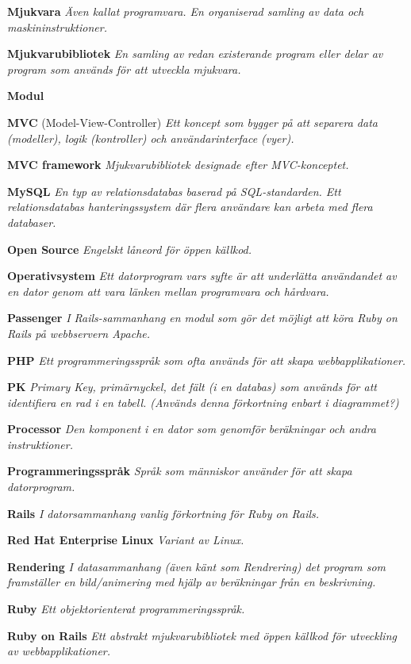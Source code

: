 \documentclass[a4paper, twoside, 11pt, titlepage]{article}
\begin{document}
	\textbf{Mjukvara} \emph{Även kallat programvara. En organiserad samling av data och maskininstruktioner.}

	\textbf{Mjukvarubibliotek} \emph{En samling av redan existerande program eller delar av program som används för att utveckla mjukvara.}

	\textbf{Modul}

	\textbf{MVC} (Model-View-Controller) \emph{Ett koncept som bygger på att separera data (modeller), logik (kontroller) och användarinterface (vyer).}

	\textbf{MVC framework} \emph{Mjukvarubibliotek designade efter MVC-konceptet.}

	\textbf{MySQL} \emph{En typ av relationsdatabas baserad på SQL-standarden. Ett relationsdatabas hanteringssystem där flera användare kan arbeta med flera databaser.}

	\textbf{Open Source} \emph{Engelskt låneord för öppen källkod.}

	\textbf{Operativsystem} \emph{Ett datorprogram vars syfte är att underlätta användandet av en dator genom att vara länken mellan programvara och hårdvara.}

	\textbf{Passenger} \emph{I Rails-sammanhang en modul som gör det möjligt att köra Ruby on Rails på webbservern Apache.}

	\textbf{PHP} \emph{Ett programmeringsspråk som ofta används för att skapa webbapplikationer.}

	\textbf{PK} \emph{Primary Key, primärnyckel, det fält (i en databas) som används för att identifiera en rad i en tabell. (Används denna förkortning enbart i diagrammet?)}

	\textbf{Processor} \emph{Den komponent i en dator som genomför beräkningar och andra instruktioner.}

	\textbf{Programmeringsspråk} \emph{Språk som människor använder för att skapa datorprogram.}

	\textbf{Rails} \emph{I datorsammanhang vanlig förkortning för Ruby on Rails.}

	\textbf{Red Hat Enterprise Linux} \emph{Variant av Linux.}

	\textbf{Rendering} \emph{I datasammanhang (även känt som Rendrering) det program som framställer en bild/animering med hjälp av beräkningar från en beskrivning.}

	\textbf{Ruby} \emph{Ett objektorienterat programmeringsspråk.}

	\textbf{Ruby on Rails} \emph{Ett abstrakt mjukvarubibliotek med öppen källkod för utveckling av webbapplikationer.}
\end{document}
